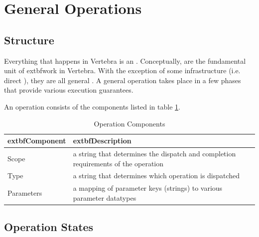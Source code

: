 \section{General Operations}


\subsection{Structure}

Everything that happens in Vertebra is an \operation{}.  Conceptually, \operations{} are the fundamental unit of         extbf{work} in Vertebra.  With the exception of some infrastructure (i.e. direct \operations{}), they are all general \operations{}.  A general operation takes place in a few phases that provide various execution guarantees.

An operation consists of the components listed in table \ref{tbl:op-parts}.

\begin{table}
        \begin{center}
                \begin{tabular}{|p{}|p{}|}
                        \hline         extbf{Component} &         extbf{Description} \\
                        \hline
                        \hline Scope      & a string that determines the dispatch and completion requirements of the operation \\
                        \hline Type       & a string that determines which operation is dispatched \\
                        \hline Parameters & a mapping of parameter keys (strings) to various parameter datatypes \\
                        \hline
                \end{tabular}
        \end{center}
        \caption{Operation Components}
        \label{tbl:op-parts}
\end{table}

\subsection{Operation States}

